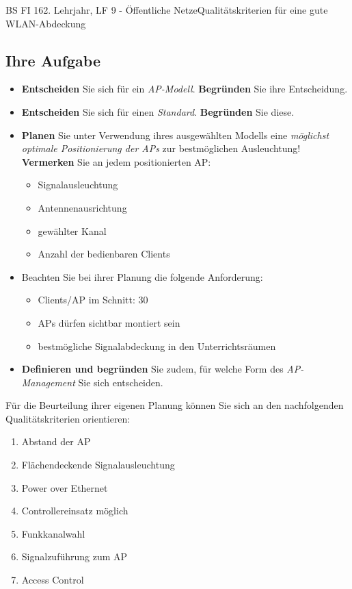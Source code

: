 \documentclass[11pt,oneside,openany,headings=optiontotoc,11pt,numbers=noenddot]{article}
\begin{document}
\begin{worksheet}{BS FI 16}{2. Lehrjahr, LF 9 - Öffentliche Netze}{Qualitätskriterien für eine gute WLAN-Abdeckung}
\begin{framed}
			\section*{Ihre Aufgabe}
			\begin{itemize}
				\item \textbf{Entscheiden} Sie sich für ein \textit{AP-Modell}. \textbf{Begründen} Sie ihre Entscheidung.
				\item \textbf{Entscheiden} Sie sich für einen \textit{Standard}. \textbf{Begründen} Sie diese.
				\item \textbf{Planen} Sie unter Verwendung ihres ausgewählten Modells eine \textit{möglichst optimale Positionierung der APs} zur bestmöglichen Ausleuchtung!\\
				\textbf{Vermerken} Sie an jedem positionierten AP:
				\begin{itemize}
					\item Signalausleuchtung
					\item Antennenausrichtung
					\item gewählter Kanal
					\item Anzahl der bedienbaren Clients
				\end{itemize}
				\item[] Beachten Sie bei ihrer Planung die folgende Anforderung:
				\begin{itemize}
					\item Clients/AP im Schnitt: \(30\)
					\item APs dürfen sichtbar montiert sein
					\item bestmögliche Signalabdeckung in den Unterrichtsräumen
				\end{itemize}
				\item \textbf{Definieren und begründen} Sie zudem, für welche Form des \textit{AP-Management} Sie sich entscheiden.
			\end{itemize}
		\end{framed}
		\begin{framed}
			Für die Beurteilung ihrer eigenen Planung können Sie sich an den nachfolgenden Qualitätskriterien orientieren:\\
			\begin{enumerate}[label*=\protect\fbox{}]
				\item Abstand der AP
				\item Flächendeckende Signalausleuchtung
				\item Power over Ethernet
				\item Controllereinsatz möglich
				\item Funkkanalwahl
				\item Signalzuführung zum AP
				\item Access Control
			\end{enumerate}
		\end{framed}
	\end{worksheet}
\end{document}
